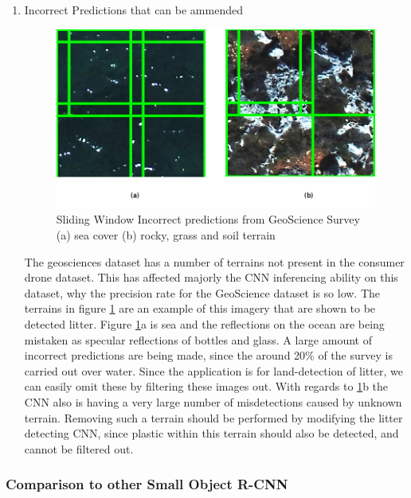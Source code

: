 \documentclass{IEEEtran}
\begin{document}
\begin{enumerate}
\item Incorrect Predictions that can be ammended
\begin{figure}[H]
\centering

\includegraphics[scale=0.4]{images/test1-correctable2.png}
\caption{Sliding Window Incorrect predictions from GeoScience Survey (a) sea cover (b) rocky, grass and soil terrain}
\label{fig:correctable2}
\end{figure}

The geosciences dataset has a number of terrains not present in the consumer drone dataset. This has affected majorly the CNN inferencing ability on this dataset, why the precision rate for the GeoScience dataset is so low. The terrains in figure \ref{fig:correctable2} are an example of this imagery that are shown to be detected litter. Figure \ref{fig:correctable2}a is sea and the reflections on the ocean are being mistaken as specular reflections of bottles and glass. A large amount of incorrect predictions are being made, since the around 20\% of the survey is carried out over water. Since the application is for land-detection of litter, we can easily omit these by filtering these images out. With regards to \ref{fig:correctable2}b the CNN also is having a very large number of misdetections caused by unknown terrain. Removing such a terrain should be performed by modifying the litter detecting CNN, since plastic within this terrain should also be detected, and cannot be filtered out.

\end{enumerate}

\subsubsection{Comparison to other Small Object R-CNN}
\end{document}

